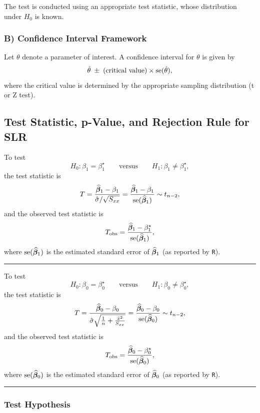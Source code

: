 The test is conducted using an appropriate test statistic, whose distribution under $H_0$ is known.

\subsubsection{B) Confidence Interval Framework}

Let $\theta$ denote a parameter of interest. A confidence interval for $\theta$ is given by
\[
\hat{\theta}
\;\pm\;
(\text{critical value}) \times \mathrm{se}(\hat{\theta}),
\]
where the critical value is determined by the appropriate sampling distribution (t or Z test).

\subsection{Test Statistic, p-Value, and Rejection Rule for SLR}

To test
\[
H_0 : \beta_1 = \beta_1^\star
\qquad \text{versus} \qquad
H_1 : \beta_1 \neq \beta_1^\star,
\]
the test statistic is
\[
T
=
\frac{\widehat{\boldsymbol{\beta}}_1 - \beta_1}
{\hat{\sigma} / \sqrt{S_{xx}}}
=
\frac{\widehat{\boldsymbol{\beta}}_1 - \beta_1}
{\mathrm{se}(\widehat{\boldsymbol{\beta}}_1)} \sim t_{n-2},
\]
and the observed test statistic is
\[
T_{\text{obs}}
=
\frac{\widehat{\boldsymbol{\beta}}_1 - \beta_1^\star}
{\mathrm{se}(\widehat{\boldsymbol{\beta}}_1)},
\]
where $\mathrm{se}(\widehat{\boldsymbol{\beta}}_1)$ is the estimated standard error of $\widehat{\boldsymbol{\beta}}_1$ (as reported by \texttt{R}).

\vspace{0.5em}
\hrule
\vspace{0.5em}

To test
\[
H_0 : \beta_0 = \beta_0^\star
\qquad \text{versus} \qquad
H_1 : \beta_0 \neq \beta_0^\star,
\]
the test statistic is
\[
T
=
\frac{\widehat{\boldsymbol{\beta}}_0 - \beta_0}
{\hat{\sigma} \sqrt{\frac{1}{n} + \frac{\bar{x}^2}{S_{xx}}}}
=
\frac{\widehat{\boldsymbol{\beta}}_0 - \beta_0}
{\mathrm{se}(\widehat{\boldsymbol{\beta}}_0)} \sim t_{n-2},
\]
and the observed test statistic is
\[
T_{\text{obs}}
=
\frac{\widehat{\boldsymbol{\beta}}_0 - \beta_0^\star}
{\mathrm{se}(\widehat{\boldsymbol{\beta}}_0)},
\]
where $\mathrm{se}(\widehat{\boldsymbol{\beta}}_0)$ is the estimated standard error of $\widehat{\boldsymbol{\beta}}_0$ (as reported by \texttt{R}).

\vspace{0.5em}
\hrule
\vspace{0.5em}

\subsubsection{Test Hypothesis}

